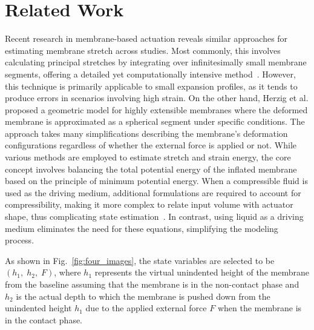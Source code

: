 \section{Related Work}
Recent research in membrane-based actuation reveals similar approaches for estimating membrane stretch across studies. Most commonly, this involves calculating principal stretches by integrating over infinitesimally small membrane segments, offering a detailed yet computationally intensive method~\cite{Zhou2018AnMembrane, Wang2017AnomalousActuation, Shi2022ModellingFingertip, Shi2023ModellingLoad}. However, this technique is primarily applicable to small expansion profiles, as it tends to produce errors in scenarios involving high strain. On the other hand, Herzig et al. \cite{Herzig2021ModelMembrane} proposed a geometric model for highly extensible membranes where the deformed membrane is approximated as a spherical segment under specific conditions.  The approach takes many simplifications describing the membrane's deformation configurations regardless of whether the external force is applied or not. While various methods are employed to estimate stretch and strain energy, the core concept involves balancing the total potential energy of the inflated membrane based on the principle of minimum potential energy. When a compressible fluid is used as the driving medium, additional formulations are required to account for compressibility, making it more complex to relate input volume with actuator shape, thus complicating state estimation~\cite{Herzig2021ModelMembrane,Shi2023ModellingLoad}. In contrast, using liquid as a driving medium eliminates the need for these equations, simplifying the modeling process.

As shown in Fig.~\ref{fig:four_images}, the state variables are selected to be $(h_1,\;h_2,\; F)$, where $h_1$ represents the virtual unindented height of the membrane from the baseline assuming that the membrane is in the non-contact phase and $h_2$ is the actual depth to which the membrane is pushed down from the unindented height $h_1$ due to the applied external force $F$ when the membrane is in the contact phase.

